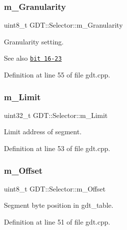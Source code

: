 \subsubsection{\texorpdfstring{m\+\_\+\+Granularity}{m\_Granularity}}
{\footnotesize\ttfamily uint8\+\_\+t G\+D\+T\+::\+Selector\+::m\+\_\+\+Granularity}



Granularity setting. 

\begin{DoxySeeAlso}{See also}
\href{https://en.wikipedia.org/wiki/Global_Descriptor_Table}{\tt bit 16-\/23} 
\end{DoxySeeAlso}


Definition at line 55 of file gdt.\+cpp.

\mbox{\label{struct_g_d_t_1_1_selector_a954aaf8e76a1f1aaaba2a7ca1b558e9f}} 
\subsubsection{\texorpdfstring{m\+\_\+\+Limit}{m\_Limit}}
{\footnotesize\ttfamily uint32\+\_\+t G\+D\+T\+::\+Selector\+::m\+\_\+\+Limit}



Limit address of segment. 



Definition at line 53 of file gdt.\+cpp.

\mbox{\label{struct_g_d_t_1_1_selector_abc557df8df987b1dc2d523156ea0ef85}} 
\subsubsection{\texorpdfstring{m\+\_\+\+Offset}{m\_Offset}}
{\footnotesize\ttfamily uint8\+\_\+t G\+D\+T\+::\+Selector\+::m\+\_\+\+Offset}



Segment byte position in gdt\+\_\+table. 



Definition at line 51 of file gdt.\+cpp.

\mbox{\label{struct_g_d_t_1_1_selector_a7bff1504d5c83c498334332274bef26d}} 
